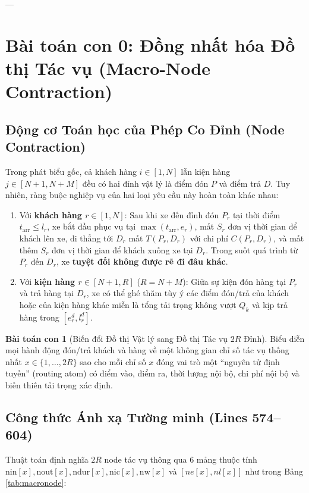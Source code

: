 \documentclass[11pt,a4paper]{article}
\theoremstyle{definition}
\newtheorem{subproblem}{Bài toán con}[section]
\begin{document}
---

\section{Bài toán con 0: Đồng nhất hóa Đồ thị Tác vụ (Macro-Node Contraction)}

\subsection{Động cơ Toán học của Phép Co Đỉnh (Node Contraction)}
Trong phát biểu gốc, cả khách hàng $i \in [1, N]$ lẫn kiện hàng $j \in [N+1, N+M]$ đều có hai đỉnh vật lý là điểm đón $P$ và điểm trả $D$. Tuy nhiên, ràng buộc nghiệp vụ của hai loại yêu cầu này hoàn toàn khác nhau:
\begin{enumerate}[leftmargin=1.5em]
    \item Với \textbf{khách hàng $r \in [1, N]$}: Sau khi xe đến đỉnh đón $P_r$ tại thời điểm $t_{\text{arr}} \le l_r$, xe bắt đầu phục vụ tại $\max(t_{\text{arr}}, e_r)$, mất $S_r$ đơn vị thời gian để khách lên xe, đi thẳng tới $D_r$ mất $T(P_r, D_r)$ với chi phí $C(P_r, D_r)$, và mất thêm $S_r$ đơn vị thời gian để khách xuống xe tại $D_r$. Trong suốt quá trình từ $P_r$ đến $D_r$, xe \textbf{tuyệt đối không được rẽ đi đâu khác}.
    \item Với \textbf{kiện hàng $r \in [N+1, R]$} ($R = N+M$): Giữa sự kiện đón hàng tại $P_r$ và trả hàng tại $D_r$, xe có thể ghé thăm tùy ý các điểm đón/trả của khách hoặc của kiện hàng khác miễn là tổng tải trọng không vượt $Q_k$ và kịp trả hàng trong $[e^d_r, l^d_r]$.
\end{enumerate}

\begin{subproblem}[Biến đổi Đồ thị Vật lý sang Đồ thị Tác vụ $2R$ Đỉnh]
Biểu diễn mọi hành động đón/trả khách và hàng về một không gian chỉ số tác vụ thống nhất $x \in \{1, \dots, 2R\}$ sao cho mỗi chỉ số $x$ đóng vai trò một ``nguyên tử định tuyến'' (routing atom) có điểm vào, điểm ra, thời lượng nội bộ, chi phí nội bộ và biến thiên tải trọng xác định.
\end{subproblem}

\subsection{Công thức Ánh xạ Tường minh (Lines 574--604)}
Thuật toán định nghĩa $2R$ node tác vụ thông qua 6 mảng thuộc tính $\text{nin}[x], \text{nout}[x], \text{ndur}[x], \text{nic}[x], \text{nw}[x]$ và $[ne[x], nl[x]]$ như trong Bảng \ref{tab:macronode}:
\end{document}
